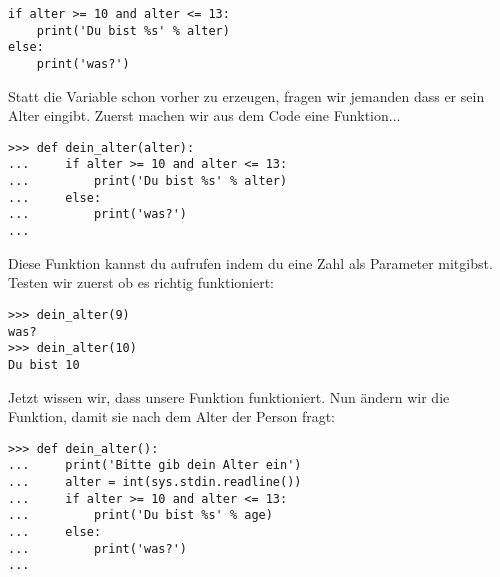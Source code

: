 \begin{Verbatim}[frame=single]
if alter >= 10 and alter <= 13:
    print('Du bist %s' % alter)
else:
    print('was?')
\end{Verbatim}

Statt die Variable  schon vorher zu erzeugen, fragen wir jemanden dass er sein Alter eingibt. Zuerst machen wir aus dem Code eine Funktion$\ldots$

\begin{Verbatim}[frame=single]
>>> def dein_alter(alter):
...     if alter >= 10 and alter <= 13:
...         print('Du bist %s' % alter)
...     else:
...         print('was?')
...
\end{Verbatim}

Diese Funktion kannst du aufrufen indem du eine Zahl als Parameter mitgibst. Testen wir zuerst ob es richtig funktioniert:

\begin{Verbatim}[frame=single]
>>> dein_alter(9)
was?
>>> dein_alter(10)
Du bist 10
\end{Verbatim}

Jetzt wissen wir, dass unsere Funktion funktioniert. Nun ändern wir die Funktion, damit sie nach dem Alter der Person fragt:

\begin{Verbatim}[frame=single]
>>> def dein_alter():
...     print('Bitte gib dein Alter ein')
...     alter = int(sys.stdin.readline())
...     if alter >= 10 and alter <= 13:
...         print('Du bist %s' % age)
...     else:
...         print('was?')
...
\end{Verbatim}

